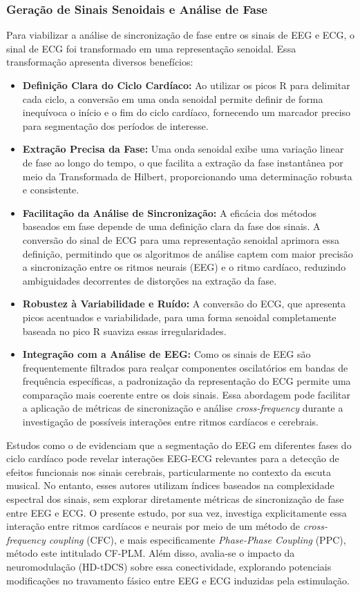 \subsubsection{Geração de Sinais Senoidais e Análise de Fase}
Para viabilizar a análise de sincronização de fase entre os sinais de EEG e ECG, o sinal de ECG foi transformado em uma representação senoidal. Essa transformação apresenta diversos benefícios:
\begin{itemize}
    \item \textbf{Definição Clara do Ciclo Cardíaco:} Ao utilizar os picos R para delimitar cada ciclo, a conversão em uma onda senoidal permite definir de forma inequívoca o início e o fim do ciclo cardíaco, fornecendo um marcador preciso para segmentação dos períodos de interesse.
    \item \textbf{Extração Precisa da Fase:} Uma onda senoidal exibe uma variação linear de fase ao longo do tempo, o que facilita a extração da fase instantânea por meio da Transformada de Hilbert, proporcionando uma determinação robusta e consistente.
    \item \textbf{Facilitação da Análise de Sincronização:} A eficácia dos métodos baseados em fase depende de uma definição clara da fase dos sinais. A conversão do sinal de ECG para uma representação senoidal aprimora essa definição, permitindo que os algoritmos de análise captem com maior precisão a sincronização entre os ritmos neurais (EEG) e o ritmo cardíaco, reduzindo ambiguidades decorrentes de distorções na extração da fase.
    \item \textbf{Robustez à Variabilidade e Ruído:} A conversão do ECG, que apresenta picos acentuados e variabilidade, para uma forma senoidal completamente baseada no pico R suaviza essas irregularidades.
    \item \textbf{Integração com a Análise de EEG:} Como os sinais de EEG são frequentemente filtrados para realçar componentes oscilatórios em bandas de frequência específicas, a padronização da representação do ECG permite uma comparação mais coerente entre os dois sinais. Essa abordagem pode facilitar a aplicação de métricas de sincronização e análise \textit{cross-frequency} durante a investigação de possíveis interações entre ritmos cardíacos e cerebrais.
\end{itemize}

Estudos como o de  evidenciam que a segmentação do EEG em diferentes fases do ciclo cardíaco pode revelar interações EEG-ECG relevantes para a detecção de efeitos funcionais nos sinais cerebrais, particularmente no contexto da escuta musical. No entanto, esses autores utilizam índices baseados na complexidade espectral dos sinais, sem explorar diretamente métricas de sincronização de fase entre EEG e ECG. O presente estudo, por sua vez, investiga explicitamente essa interação entre ritmos cardíacos e neurais por meio de um método de \textit{cross-frequency coupling} (CFC), e mais especificamente \textit{Phase-Phase Coupling} (PPC), método este intitulado CF-PLM. Além disso, avalia-se o impacto da neuromodulação (HD-tDCS) sobre essa conectividade, explorando potenciais modificações no travamento fásico entre EEG e ECG induzidas pela estimulação.

